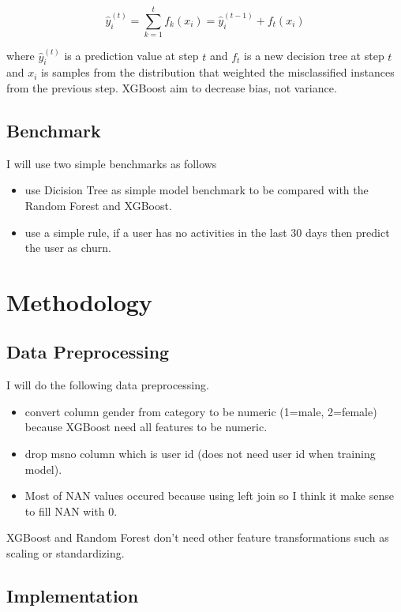 \documentclass[11pt]{article}
\begin{document}
\[\hat{y}_i^{(t)} = \sum_{k=1}^t f_k(x_i)= \hat{y}_i^{(t-1)} + f_t(x_i)\]

where $\hat{y}_i^{(t)}$ is a prediction value at step $t$ and $f_t$ is a
new decision tree at step $t$ and $x_i$ is samples from the distribution
that weighted the misclassified instances from the previous step.
XGBoost aim to decrease bias, not variance.

    \subsection{Benchmark}\label{benchmark}

I will use two simple benchmarks as follows

\begin{itemize}
\itemsep1pt\parskip0pt
\item
  use Dicision Tree as simple model benchmark to be compared with the
  Random Forest and XGBoost.
\item
  use a simple rule, if a user has no activities in the last 30 days
  then predict the user as churn.
\end{itemize}

    \section{Methodology}\label{methodology}

\subsection{Data Preprocessing}\label{data-preprocessing}

I will do the following data preprocessing.

\begin{itemize}
\itemsep1pt\parskip0pt
\item
  convert column gender from category to be numeric (1=male, 2=female)
  because XGBoost need all features to be numeric.
\item
  drop msno column which is user id (does not need user id when training
  model).
\item
  Most of NAN values occured because using left join so I think it make
  sense to fill NAN with 0.
\end{itemize}

XGBoost and Random Forest don't need other feature transformations such
as scaling or standardizing.

    \subsection{Implementation}\label{implementation}
\end{document}
